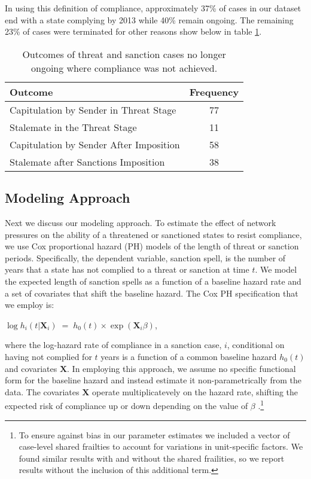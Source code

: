 In using this definition of compliance, approximately 37\% of cases in our dataset end with a state complying by 2013 while 40\% remain ongoing. The remaining 23\% of cases were terminated for other reasons show below in table \ref{tab:termCases}.

\begin{table}[ht]
	\centering
	\begin{tabular}{lc}
		\hline\hline
		Outcome & Frequency \\
		\hline
		Capitulation by Sender in Threat Stage & 77 \\
		Stalemate in the Threat Stage & 11 \\		
		Capitulation by Sender After Imposition & 58 \\
		Stalemate after Sanctions Imposition & 38 \\
		\hline\hline
	\end{tabular}
	\caption{Outcomes of threat and sanction cases no longer ongoing where compliance was not achieved.}
	\label{tab:termCases}	
\end{table}
\FloatBarrier


\subsection*{Modeling Approach} 

Next we discuss our modeling approach. To estimate the effect of network pressures on the ability of a threatened or sanctioned states to resist compliance, we use Cox proportional hazard (PH) models of the length of threat or sanction periods. Specifically, the dependent variable, sanction spell, is the number of years that a state has not complied to a threat or sanction at time $t$. We model the expected length of sanction spells as a function of a baseline hazard rate and a set of covariates that shift the baseline hazard. The Cox PH specification that we employ is:

\begin{center}
	$\log h_{i}(t | \boldsymbol{X}_{i}) \; = \; h_{0}(t) \times \exp(\boldsymbol{X}_{i} \beta)$,
\end{center}

where the log-hazard rate of compliance in a sanction case, $i$, conditional on having not complied for $t$ years is a function of a common baseline hazard $h_{0}(t)$ and covariates $\boldsymbol{X}$. In employing this approach, we assume no specific functional form for the baseline hazard and instead estimate it non-parametrically from the data. The covariates $\boldsymbol{X}$ operate multiplicatevely on the hazard rate, shifting the expected risk of compliance up or down depending on the value of $\beta$ \citep{crespo2013political}.\footnote{To ensure against bias in our parameter estimates we included a vector of case-level shared frailties to account for variations in unit-specific factors. We found similar results with and without the shared frailities, so we report results without the inclusion of this additional term.} 

